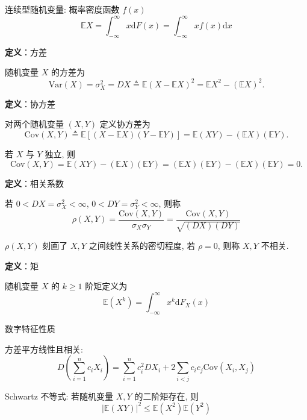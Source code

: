 \documentclass[openany]{ctexbook}
\theoremstyle{kaiti}
\theoremstyle{normal}
\begin{document}
连续型随机变量: 概率密度函数 $f(x)$
\begin{equation}
  \mathbb{E}X=\int_{-\infty}^\infty x\mathrm{d}F(x)=\int_{-\infty}^\infty xf(x)\mathrm{d}x
\end{equation}


\textbf{定义}：方差

随机变量 $X$ 的方差为
\begin{equation}
  \mathrm{Var}(X)=\sigma_X^2=DX\triangleq \mathbb{E}(X-\mathbb{E}X)^2=\mathbb{E}X^2-(\mathbb{E}X)^2.
\end{equation}


\textbf{定义}：协方差

对两个随机变量 $(X,Y)$ 定义协方差为
\begin{equation}
  \mathrm{Cov}(X,Y)\triangleq \mathbb{E}[(X-\mathbb{E}X)(Y-\mathbb{E}Y)]=\mathbb{E}(XY)-(\mathbb{E}X)(\mathbb{E}Y).
\end{equation}
 

若 $X$ 与 $Y$ 独立, 则
\begin{equation}
  \mathrm{Cov}(X,Y)=\mathbb{E}(XY)-(\mathbb{E}X)(\mathbb{E}Y)=(\mathbb{E}X)(\mathbb{E}Y)-(\mathbb{E}X)(\mathbb{E}Y)=0.
\end{equation}


\textbf{定义}：相关系数

若 $0<DX=\sigma_X^2<\infty$, $0<DY=\sigma_Y^2<\infty$, 则称
\begin{equation}
  \rho(X,Y)=\frac{\mathrm{Cov}(X,Y)}{\sigma_X\sigma_Y}=\frac{\mathrm{Cov}(X,Y)}{\sqrt{(DX)(DY)}}
\end{equation}


$\rho(X,Y)$ 刻画了 $X,Y$ 之间线性关系的密切程度, 若 $\rho=0$, 则称 $X,Y$ 不相关.

\textbf{定义}：矩

随机变量 $X$ 的 $k\geqslant1$ 阶矩定义为
\begin{equation}
  \mathbb{E}(X^k)=\int_{-\infty}^\infty x^k\mathrm{d}F_X(x)
\end{equation}


数字特征性质

方差平方线性且相关:
\begin{equation}
  D\left(\sum_{i=1}^nc_iX_i\right)=\sum_{i=1}^nc_i^2DX_i+2\sum_{i<j}c_ic_j\mathrm{Cov}(X_i,X_j)
\end{equation}


Schwartz 不等式: 若随机变量 $X,Y$ 的二阶矩存在, 则
\begin{equation}
  |\mathbb{E}(XY)|^2\leqslant \mathbb{E}(X^2)\mathbb{E}(Y^2)
\end{equation}
\end{document}
